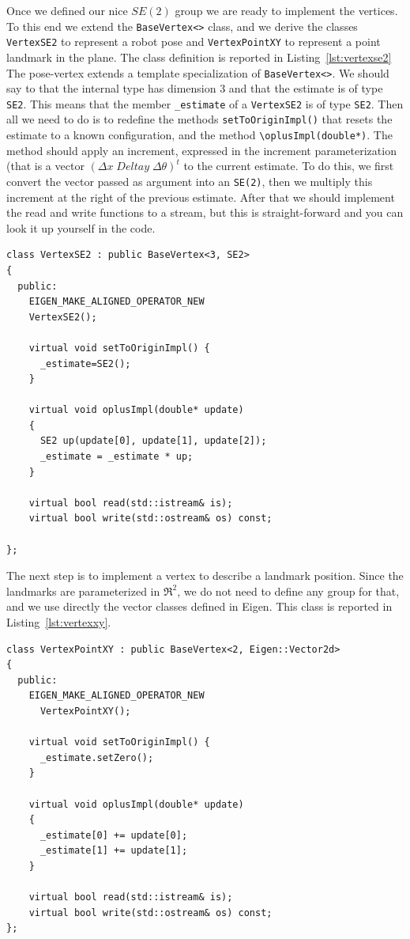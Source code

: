 \documentclass[a4paper]{article}
\begin{document}
Once we defined our nice $SE(2)$ group we are ready to implement the
vertices.  To this end we extend the \verb+BaseVertex<>+ class, and we
derive the classes \verb+VertexSE2+ to represent a robot pose and
\verb+VertexPointXY+ to represent a point landmark in the plane.
The class definition is reported in Listing~\ref{lst:vertexse2}
The pose-vertex extends a template specialization of
\verb+BaseVertex<>+.  We should say to \gopt{} that the internal type
has dimension 3 and that the estimate is of type \verb+SE2+. This
means that the member \verb+_estimate+ of a \verb+VertexSE2+ is of
type \verb+SE2+.  Then all we need to do is to redefine the methods
\verb+setToOriginImpl()+ that resets the estimate to a known
configuration, and the method \verb+\oplusImpl(double*)+.  The method
should apply an increment, expressed in the increment parameterization
(that is a vector $(\Delta x \; Delta y \; \Delta \theta )^t$ to the
current estimate.  To do this, we first convert the vector passed as
argument into an \verb+SE(2)+, then we multiply this increment at the
right of the previous estimate.  After that we should implement the
read and write functions to a stream, but this is straight-forward and
you can look it up yourself in the code. 

\begin{lstlisting}[float,label=lst:vertexse2,caption=Vertex representing
  a 2D robot pose]
class VertexSE2 : public BaseVertex<3, SE2>
{
  public:
    EIGEN_MAKE_ALIGNED_OPERATOR_NEW
    VertexSE2();

    virtual void setToOriginImpl() {
      _estimate=SE2();
    }

    virtual void oplusImpl(double* update)
    {
      SE2 up(update[0], update[1], update[2]);
      _estimate = _estimate * up;
    }

    virtual bool read(std::istream& is);
    virtual bool write(std::ostream& os) const;

};
\end{lstlisting}
The next step is to implement a vertex to describe a landmark
position.  Since the landmarks are parameterized in $\Re^2$, we do not
need to define any group for that, and we use directly the vector
classes defined in Eigen. This class is reported in Listing~\ref{lst:vertexxy}.

\begin{lstlisting}[float,label=lst:vertexxy,caption=Vertex representing
  a 2D landmark]
class VertexPointXY : public BaseVertex<2, Eigen::Vector2d>
{
  public:
    EIGEN_MAKE_ALIGNED_OPERATOR_NEW
      VertexPointXY();

    virtual void setToOriginImpl() {
      _estimate.setZero();
    }

    virtual void oplusImpl(double* update)
    {
      _estimate[0] += update[0];
      _estimate[1] += update[1];
    }

    virtual bool read(std::istream& is);
    virtual bool write(std::ostream& os) const;
};
\end{lstlisting}
\end{document}
